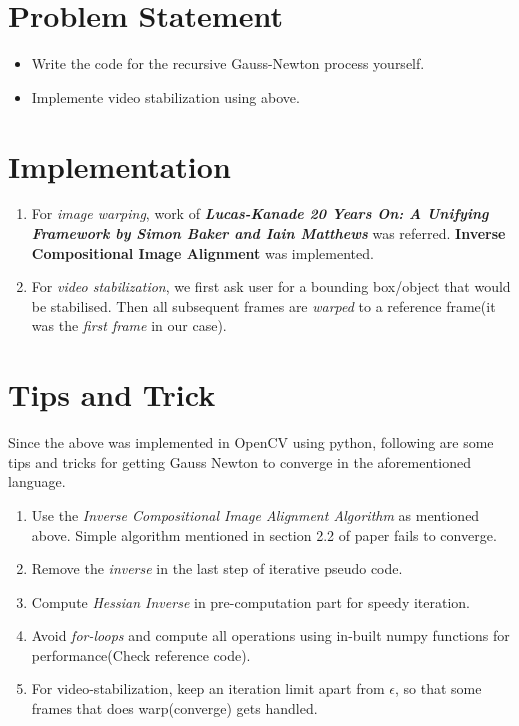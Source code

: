 \documentclass[12pt]{article}
\author{
  Gupta, Ankesh\\
  \texttt{2015CS10435}
}
\begin{document}
\maketitle

\section{Problem Statement}
\begin{itemize}
    \item Write the code for the recursive Gauss-Newton process yourself.
    \item Implemente video stabilization using above.
\end{itemize}


\section{Implementation}
\begin{enumerate}
    \item For \emph{image warping}, work of \textbf{\emph{Lucas-Kanade 20 Years On: A Unifying Framework by Simon Baker and Iain Matthews}} was referred. \textbf{Inverse Compositional Image Alignment} was implemented. 
    \item For \emph{video stabilization}, we first ask user for a bounding box/object that would be stabilised. Then all subsequent frames are \emph{warped} to a reference frame(it was the \emph{first frame} in our case).
\end{enumerate}

\section{Tips and Trick}
Since the above was implemented in OpenCV using python, following are some tips and tricks for getting Gauss Newton to converge in the aforementioned language.
\begin{enumerate}
    \item Use the \emph{Inverse Compositional Image Alignment Algorithm} as mentioned above. Simple algorithm mentioned in section 2.2 of paper fails to converge.
    \item Remove the \emph{inverse} in the last step of iterative pseudo code.
    \item Compute \emph{Hessian Inverse} in pre-computation part for speedy iteration.
    \item Avoid \emph{for-loops} and compute all operations using in-built numpy functions for performance(Check reference code).
    \item For video-stabilization, keep an iteration limit apart from $\epsilon$, so that some frames that does warp(converge) gets handled.
\end{enumerate}
\end{document}
